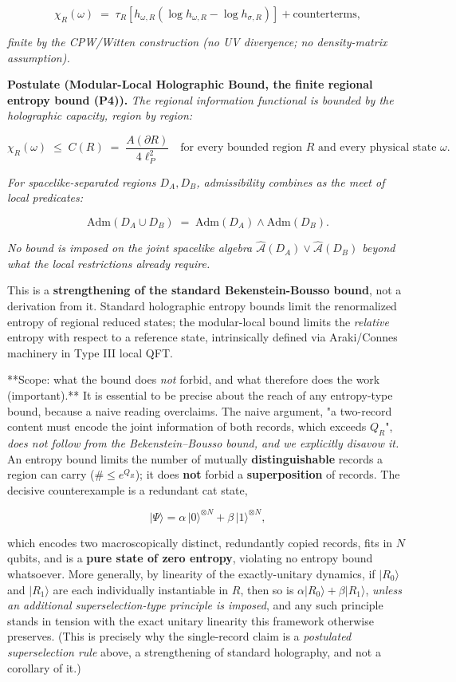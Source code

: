 \documentclass[11pt,a4paper]{article}
\begin{document}
\[
\chi_R(\omega) \;=\; \tau_R\!\left[ h_{\omega, R} \left( \log h_{\omega, R} - \log h_{\sigma, R} \right) \right] + \text{counterterms},
\]

\emph{finite by the CPW/Witten construction (no UV divergence; no density-matrix assumption).}

\textbf{Postulate (Modular-Local Holographic Bound, the finite regional entropy bound (P4)).} \emph{The regional information functional is bounded by the holographic capacity, region by region:}

\[
\boxed{\chi_R(\omega) \;\le\; C(R) \;=\; \frac{A(\partial R)}{4\ell_P^2} \quad \text{for every bounded region } R \text{ and every physical state } \omega.}
\]

\emph{For spacelike-separated regions $D_A, D_B$, admissibility combines as the meet of local predicates:}

\[
\mathrm{Adm}(D_A \cup D_B) \;=\; \mathrm{Adm}(D_A) \wedge \mathrm{Adm}(D_B).
\]

\emph{No bound is imposed on the joint spacelike algebra $\hat{\mathcal{A}}(D_A) \vee \hat{\mathcal{A}}(D_B)$ beyond what the local restrictions already require.}

This is a \textbf{strengthening of the standard Bekenstein-Bousso bound}, not a derivation from it. Standard holographic entropy bounds limit the renormalized entropy of regional reduced states; the modular-local bound limits the \emph{relative} entropy with respect to a reference state, intrinsically defined via Araki/Connes machinery in Type III local QFT.

**Scope: what the bound does \emph{not} forbid, and what therefore does the work (important).** It is essential to be precise about the reach of any entropy-type bound, because a naive reading overclaims. The naive argument, "a two-record content must encode the joint information of both records, which exceeds $Q_R$", \emph{does not follow from the Bekenstein–Bousso bound, and we explicitly disavow it.} An entropy bound limits the number of mutually \textbf{distinguishable} records a region can carry ($\# \le e^{Q_R}$); it does \textbf{not} forbid a \textbf{superposition} of records. The decisive counterexample is a redundant cat state,

\[
|\Psi\rangle = \alpha\,|0\rangle^{\otimes N} + \beta\,|1\rangle^{\otimes N},
\]

which encodes two macroscopically distinct, redundantly copied records, fits in $N$ qubits, and is a \textbf{pure state of zero entropy}, violating no entropy bound whatsoever. More generally, by linearity of the exactly-unitary dynamics, if $|R_0\rangle$ and $|R_1\rangle$ are each individually instantiable in $R$, then so is $\alpha|R_0\rangle + \beta|R_1\rangle$, \emph{unless an additional superselection-type principle is imposed}, and any such principle stands in tension with the exact unitary linearity this framework otherwise preserves. (This is precisely why the single-record claim is a \emph{postulated superselection rule} above, a strengthening of standard holography, and not a corollary of it.)
\end{document}
